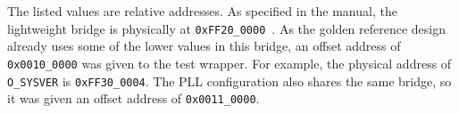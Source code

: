The listed values are relative addresses.
As specified in the manual, the lightweight bridge is physically at \texttt{0xFF20\_0000}~\cite{Altera6}.
As the golden reference design already uses some of the lower values in this bridge, an offset address of \texttt{0x0010\_0000} was given to the test wrapper.
For example, the physical address of \texttt{O\_SYSVER} is \texttt{0xFF30\_0004}.
The PLL configuration also shares the same bridge, so it was given an offset address of \texttt{0x0011\_0000}.
